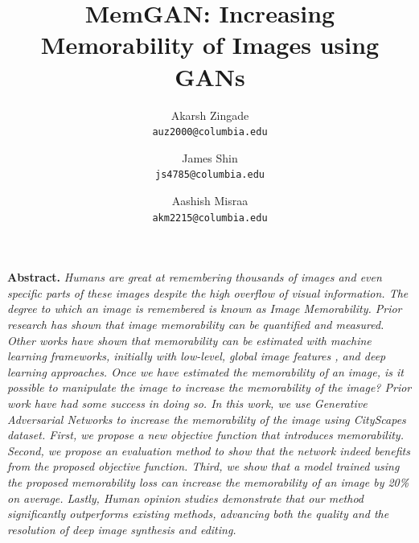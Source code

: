 \documentclass[10pt,twocolumn,letterpaper]{article}
\begin{document}
\title{MemGAN: Increasing Memorability of Images using GANs}

\author{Akarsh Zingade\\
{\tt\small auz2000@columbia.edu}
\and
James Shin\\
{\tt\small js4785@columbia.edu}
\and
Aashish Misraa\\
{\tt\small akm2215@columbia.edu}
}

\maketitle










\textbf{Abstract.} \textit{Humans are great at remembering thousands of images and even specific parts of these images despite the high overflow of visual information. The degree to which an image is remembered is known as Image Memorability. Prior research \cite{memo} has shown that image memorability can be quantified and measured. Other works have shown that memorability can be estimated with machine learning frameworks, initially with low-level, global image features \cite{photo_mem}, and deep learning \cite{image_mem_deep, mem_pred_bias, adap_transf} approaches. Once we have estimated the memorability of an image, is it possible to manipulate the image to increase the memorability of the image? Prior work \cite{photo,style,face} have had some success in doing so. In this work, we use Generative Adversarial Networks to increase the memorability of the image using CityScapes dataset. First, we propose a new objective function that introduces memorability. Second, we propose an evaluation method to show that the network indeed benefits from the proposed objective function. Third, we show that a model trained using the proposed memorability loss can increase the memorability of an image by 20\% on average. Lastly, Human opinion studies demonstrate that our method significantly outperforms existing methods, advancing both the quality and the resolution of deep image synthesis and editing.}

\end{document}
